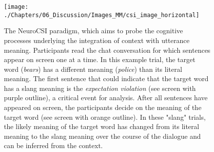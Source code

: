 \begin{figure}[!h]
	\centering
	\hspace*{-0.7cm}
	\texttt{[image: ./Chapters/06\_Discussion/Images\_MM/csi\_image\_horizontal]}
	\caption{The NeuroCSI paradigm, which aims to probe the cognitive processes underlying the integration of context with utterance meaning. Participants read the chat conversation for which sentences appear on screen one at a time. In this example trial, the target word (\textit{bears}) has a different meaning (\textit{police}) than its literal meaning. The first sentence that could indicate that the target word has a slang meaning is the \textit{expectation violation} (see screen with purple outline), a critical event for analysis. After all sentences have appeared on screen, the participants decide on the meaning of the target word (see screen with orange outline). In these "slang" trials, the likely meaning of the target word has changed from its literal meaning to the slang meaning over the course of the dialogue and can be inferred from the context. }
    \vspace*{-10pt}
	\label{fig:csi}
\end{figure}